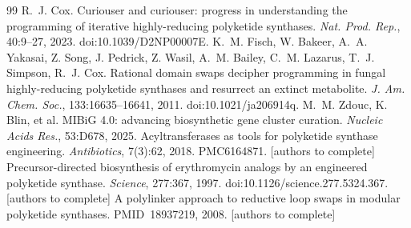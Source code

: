 \documentclass[11pt]{article}
\begin{document}
\begin{thebibliography}{99}\small
 R.~J. Cox. Curiouser and curiouser: progress in understanding the
programming of iterative highly-reducing polyketide synthases. \emph{Nat. Prod. Rep.}, 40:9--27, 2023.
doi:10.1039/D2NP00007E.
 K.~M. Fisch, W. Bakeer, A.~A. Yakasai, Z. Song, J. Pedrick,
Z. Wasil, A.~M. Bailey, C.~M. Lazarus, T.~J. Simpson, R.~J. Cox. Rational domain swaps decipher
programming in fungal highly-reducing polyketide synthases and resurrect an extinct metabolite.
\emph{J. Am. Chem. Soc.}, 133:16635--16641, 2011. doi:10.1021/ja206914q.
 M.~M. Zdouc, K. Blin, et al. MIBiG 4.0: advancing biosynthetic gene
cluster curation. \emph{Nucleic Acids Res.}, 53:D678, 2025.
 Acyltransferases as tools for polyketide synthase
engineering. \emph{Antibiotics}, 7(3):62, 2018. PMC6164871. [authors to complete]
 Precursor-directed biosynthesis of erythromycin
analogs by an engineered polyketide synthase. \emph{Science}, 277:367, 1997.
doi:10.1126/science.277.5324.367. [authors to complete]
 A polylinker approach to reductive loop swaps in
modular polyketide synthases. PMID~18937219, 2008. [authors to complete]
\end{thebibliography}
\end{document}
